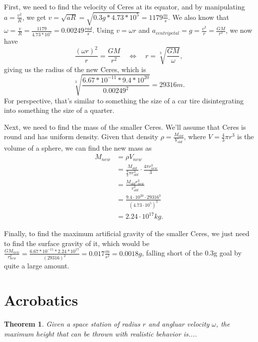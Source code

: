 \documentclass{amsart}
\newtheorem{theorem}{Theorem}[section]
\theoremstyle{definition}
\begin{document}
First, we need to find the velocity of Ceres at its equator, and by manipulating \(a = \frac{v^2}{R}\), we get \(v = \sqrt{aR}= \sqrt{0.3g * 4.73 * 10^5} = 1179\frac{m}{s}\). We also know that \(\omega = \frac{v}{R} = \frac{1179}{4.73*10^5} = 0.00249\frac{rad}{s}\). Using \(v=\omega  r\) and \(a_{centripetal} = g = \frac{v^2}{r} = \frac{GM}{r^2}\), we now have 
\[
\frac{(\omega r)^2}{r} = \frac{G M}{r^2}\quad
\Leftrightarrow \quad r = \sqrt[3]{\frac{GM}{\omega}},
\]
giving us the radius of the new Ceres, which is 
\[
\sqrt[3]{
\frac{6.67*10^{-11}*9.4*10^{20}}{0.00249^2}
} = 29316m.
\]
For perspective, that's similar to something the size of a car tire disintegrating into something the size of a quarter.

Next, we need to find the mass of the smaller Ceres. We'll assume that Ceres is round and has uniform density. Given that density \(\rho = \frac{M_{old}}{V_{old}}\), where \(V=\frac{4}{3}\pi r^3\) is the volume of a sphere, we can find the new mass as 
\begin{align*}
    M_{new} &= \rho V_{new}\\
    &= \frac{M_{old}}{\frac{4}{3}\pi r_{old}^3}\cdot \frac{4\pi r_{new}^3}{3} \\
    &= \frac{M_{old}r_{new}^3}{r_{old}^3} \\
    &= \frac{9.4\cdot10^{20} \cdot 29316^3}{(4.73\cdot 10^5)^3} \\
    &= 2.24\cdot10^{17}kg.
\end{align*}

Finally, to find the maximum artificial gravity of the smaller Ceres, we just need to find the surface gravity of it, which would be \(\frac{GM_{new}}{r_{new}^2}=\frac{6.67*10^{-11}*2.24*10^{17}}{(29316)^2} = 0.017\frac{m}{s^2} = 0.0018g\), falling short of the 0.3g goal by quite a large amount.




\section{Acrobatics}



\begin{theorem}
  Given a space station of radius $r$ and angluar velocity $\omega$, the maximum height that can be thrown with realistic behavior is....
\end{theorem}
\end{document}
